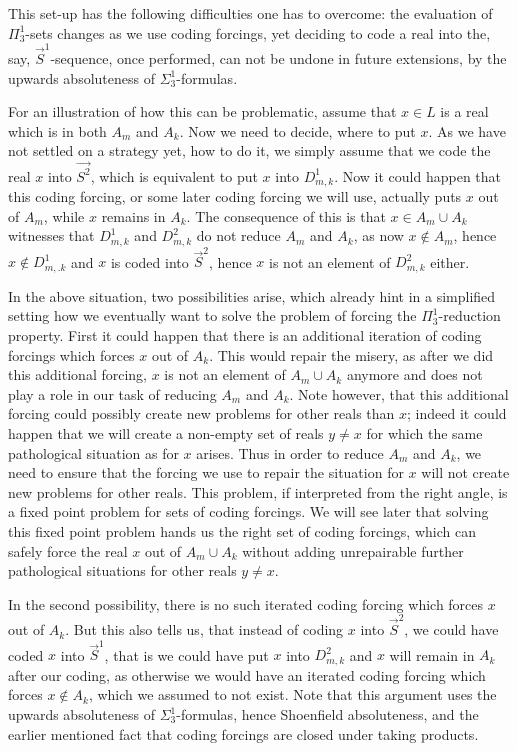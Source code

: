 \documentclass[a4paper,11pt]{article}
\begin{document}
This set-up has the following difficulties one has to overcome: the evaluation of $\Pi^1_3$-sets changes as we use coding forcings, yet deciding to code a real into the, say, $\vec{S}^1$-sequence, once performed, can not be undone in future extensions, by the upwards absoluteness of $\Sigma^1_3$-formulas.

For an illustration of how this can be problematic, assume that $x \in L$ is a real which is in both $A_m$ and $A_k$. Now we need to decide, where to put $x$. As we have not settled on a strategy yet, how to do it, we simply
assume that we code the real $x$ into $\vec{S^2}$, which is equivalent to put $x$ into $D^1_{m,k}$. Now it could happen that this coding forcing, or some later coding forcing we will use, actually puts $x$ out of $A_m$, while $x$ remains in $A_k$. The consequence of this is that $x \in A_m \cup A_k$ witnesses that $D^1_{m,k}$ and $D^2_{m,k}$ do not reduce $A_m$ and $A_k$, as now $x \notin A_m$, hence $x\notin D^1_{m,.k}$ and $x$ is coded into $\vec{S}^2$, hence $x$ is not an element of $D^2_{m,k}$ either.

In the above situation, two possibilities arise, which already hint in a simplified setting how we eventually want to solve the problem of forcing the $\Pi^1_3$-reduction property.
First it could happen that there is an additional iteration of coding forcings which forces $x$ out of $A_k$. This would repair the misery, as after we did this additional forcing, $x$ is not an element of $A_m \cup A_k$ anymore and does not play a role in our task of reducing $A_m$ and $A_k$. Note however, that this additional forcing could possibly create new problems for other reals than $x$; indeed it could happen that we will create a non-empty set of reals $y \ne x$ for which the same pathological situation as for $x$ arises. Thus in order to reduce $A_m$ and $A_k$, we need  to ensure that the forcing we use to repair the situation for $x$ will not create new problems for other reals. This problem, if interpreted from the right angle, is a fixed point problem for sets of coding forcings. We will see later that solving this fixed point problem hands us the right set of coding forcings, which can safely force the real $x$ out of $A_m \cup A_k$ without adding unrepairable further pathological situations for other reals $y \ne x$.

In the second possibility, there is no such iterated coding forcing which forces $x$ out of $A_k$. 
But this also tells us, that instead of coding $x$ into $\vec{S}^2$, we could have coded $x$ into $\vec{S}^1$, that is we could have put $x$ into $D^2_{m,k}$ and $x$ will remain in $A_k$ after our coding, as otherwise we would have an iterated coding forcing which forces $x \notin A_k$, which we assumed to not exist. 
Note that this argument uses the upwards absoluteness of $\Sigma^1_3$-formulas, hence Shoenfield absoluteness, and the earlier mentioned fact that coding forcings are closed under taking products.
\end{document}
